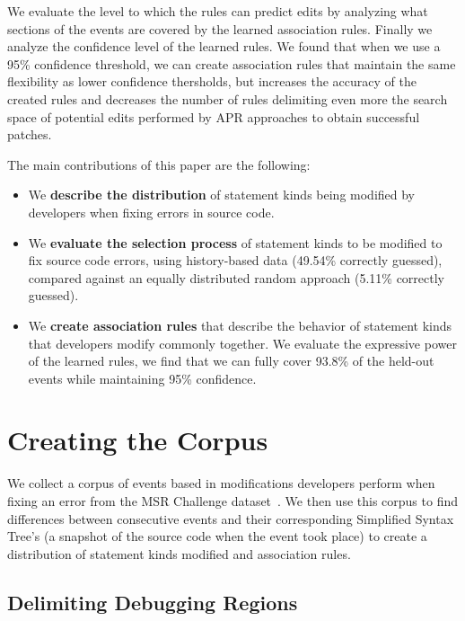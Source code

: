 \documentclass[sigconf]{acmart}
\begin{document}
We evaluate the level to which the rules can predict edits
by analyzing what sections of the events are covered by the 
learned association rules. 
Finally we analyze
the confidence level of the learned rules. 
We found that when we use a 95\% confidence
threshold, we can create association
rules that maintain the same flexibility as 
lower confidence thersholds, but increases
the accuracy of the created rules and decreases the number of rules
delimiting even more the search space of potential edits
performed by APR approaches to obtain successful patches.

The main contributions of this paper are the following:
\begin{itemize}
\item We \textbf{describe the distribution} of statement kinds being
modified by developers when fixing errors in source code. 

\item We \textbf{evaluate
the selection process} of statement kinds to be modified
to fix source code errors, using history-based data (49.54\% correctly guessed), compared against
an equally distributed random approach (5.11\% correctly guessed).

\item We \textbf{create association rules} that describe the behavior
of statement kinds that developers modify commonly together. 
We evaluate the expressive power of the learned rules, we find
that we can fully cover 93.8\% of the held-out events while maintaining
95\% confidence.

\end{itemize}

\section{Creating the Corpus}

We collect a corpus of events based in modifications 
developers perform when fixing an error from the MSR Challenge 
dataset~\cite{msr18challenge}. We then
use this corpus to find differences between consecutive events
and their corresponding Simplified Syntax Tree's (a snapshot of
the source code when the event took place) to create a distribution 
of statement kinds modified and association rules.

\subsection{Delimiting Debugging Regions}
\label{delimitDebugRegions}
\end{document}
